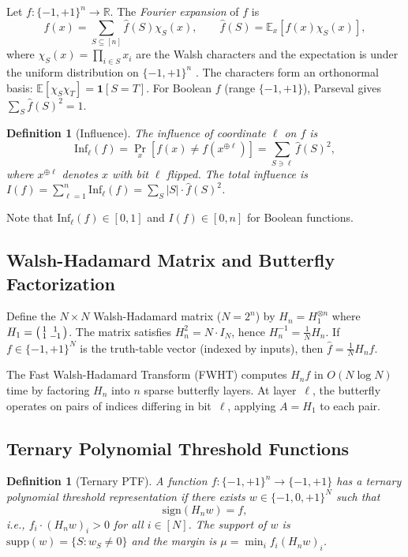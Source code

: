 \documentclass[11pt]{article}
\newtheorem{definition}[theorem]{Definition}
\newcommand{\R}{\mathbb{R}}
\newcommand{\E}{\mathbb{E}}
\newcommand{\Inf}{\mathrm{Inf}}
\newcommand{\sign}{\mathrm{sign}}
\newcommand{\supp}{\mathrm{supp}}
\begin{document}
Let $f:\{-1,+1\}^n \to \R$. The \emph{Fourier expansion} of $f$ is
\begin{equation}
\label{eq:fourier}
    f(x) = \sum_{S \subseteq [n]} \hat{f}(S) \chi_S(x), \qquad \hat{f}(S) = \E_x[f(x) \chi_S(x)],
\end{equation}
where $\chi_S(x) = \prod_{i \in S} x_i$ are the Walsh characters and the expectation is under the uniform distribution on $\{-1,+1\}^n$ \cite{odonnell2014analysis}. The characters form an orthonormal basis: $\E[\chi_S \chi_T] = \mathbf{1}[S = T]$. For Boolean $f$ (range $\{-1,+1\}$), Parseval gives $\sum_S \hat{f}(S)^2 = 1$.

\begin{definition}[Influence]
The \emph{influence} of coordinate $\ell$ on $f$ is
\[
\Inf_\ell(f) = \Pr_x[f(x) \neq f(x^{\oplus \ell})] = \sum_{S \ni \ell} \hat{f}(S)^2,
\]
where $x^{\oplus \ell}$ denotes $x$ with bit $\ell$ flipped. The \emph{total influence} is $I(f) = \sum_{\ell=1}^n \Inf_\ell(f) = \sum_S |S| \cdot \hat{f}(S)^2$.
\end{definition}

Note that $\Inf_\ell(f) \in [0, 1]$ and $I(f) \in [0, n]$ for Boolean functions.

\subsection{Walsh-Hadamard Matrix and Butterfly Factorization}

Define the $N \times N$ Walsh-Hadamard matrix ($N = 2^n$) by $H_n = H_1^{\otimes n}$ where $H_1 = \begin{psmallmatrix} 1 & 1 \\ 1 & -1 \end{psmallmatrix}$. The matrix satisfies $H_n^2 = N \cdot I_N$, hence $H_n^{-1} = \frac{1}{N} H_n$. If $f \in \{-1,+1\}^N$ is the truth-table vector (indexed by inputs), then $\hat{f} = \frac{1}{N} H_n f$.

The Fast Walsh-Hadamard Transform (FWHT) computes $H_n f$ in $O(N \log N)$ time by factoring $H_n$ into $n$ sparse butterfly layers. At layer~$\ell$, the butterfly operates on pairs of indices differing in bit~$\ell$, applying $A = H_1$ to each pair.

\subsection{Ternary Polynomial Threshold Functions}

\begin{definition}[Ternary PTF]
\label{def:ptf}
A function $f:\{-1,+1\}^n \to \{-1,+1\}$ has a \emph{ternary polynomial threshold representation} if there exists $w \in \{-1, 0, +1\}^{N}$ such that
\[
\sign(H_n w) = f,
\]
i.e., $f_i \cdot (H_n w)_i > 0$ for all $i \in [N]$. The \emph{support} of $w$ is $\supp(w) = \{S : w_S \neq 0\}$ and the \emph{margin} is $\mu = \min_i f_i (H_n w)_i$.
\end{definition}
\end{document}
